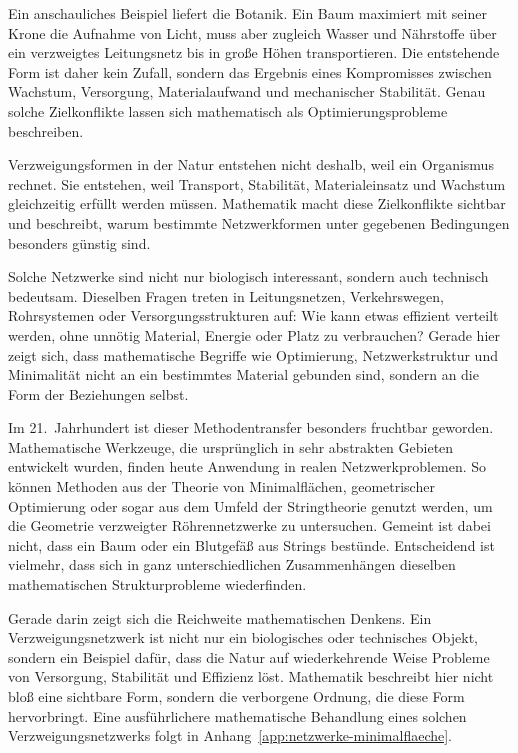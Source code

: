 Ein anschauliches Beispiel liefert die Botanik.
Ein Baum maximiert mit seiner Krone die Aufnahme von Licht,
muss aber zugleich Wasser und Nährstoffe über ein verzweigtes Leitungsnetz
bis in große Höhen transportieren.
Die entstehende Form ist daher kein Zufall,
sondern das Ergebnis eines Kompromisses zwischen Wachstum,
Versorgung,
Materialaufwand
und mechanischer Stabilität.
Genau solche Zielkonflikte lassen sich mathematisch als Optimierungsprobleme beschreiben.

\begin{DidacticBox}
	\label{box:verzweigungsnetzwerk}
	Verzweigungsformen in der Natur entstehen nicht deshalb,
	weil ein Organismus \glqq rechnet\grqq.
	Sie entstehen,
	weil Transport,
	Stabilität,
	Materialeinsatz
	und Wachstum gleichzeitig erfüllt werden müssen.
	Mathematik macht diese Zielkonflikte sichtbar
	und beschreibt,
	warum bestimmte Netzwerkformen unter gegebenen Bedingungen besonders günstig sind.
\end{DidacticBox}

Solche Netzwerke sind nicht nur biologisch interessant,
sondern auch technisch bedeutsam.
Dieselben Fragen treten in Leitungsnetzen,
Verkehrswegen,
Rohrsystemen
oder Versorgungsstrukturen auf:
Wie kann etwas effizient verteilt werden,
ohne unnötig Material,
Energie
oder Platz zu verbrauchen?
Gerade hier zeigt sich,
dass mathematische Begriffe wie Optimierung,
Netzwerkstruktur
und Minimalität nicht an ein bestimmtes Material gebunden sind,
sondern an die Form der Beziehungen selbst.

Im 21.~Jahrhundert ist dieser Methodentransfer besonders fruchtbar geworden.
Mathematische Werkzeuge,
die ursprünglich in sehr abstrakten Gebieten entwickelt wurden,
finden heute Anwendung in realen Netzwerkproblemen.
So können Methoden aus der Theorie von Minimalflächen,
geometrischer Optimierung
oder sogar aus dem Umfeld der Stringtheorie genutzt werden,
um die Geometrie verzweigter Röhrennetzwerke zu untersuchen.
Gemeint ist dabei nicht,
dass ein Baum oder ein Blutgefäß \glqq aus Strings\grqq{} bestünde.
Entscheidend ist vielmehr,
dass sich in ganz unterschiedlichen Zusammenhängen dieselben mathematischen Strukturprobleme wiederfinden.

Gerade darin zeigt sich die Reichweite mathematischen Denkens.
Ein Verzweigungsnetzwerk ist nicht nur ein biologisches oder technisches Objekt,
sondern ein Beispiel dafür,
dass die Natur auf wiederkehrende Weise Probleme von Versorgung,
Stabilität
und Effizienz löst.
Mathematik beschreibt hier nicht bloß eine sichtbare Form,
sondern die verborgene Ordnung,
die diese Form hervorbringt.
Eine ausführlichere mathematische Behandlung eines solchen Verzweigungsnetzwerks
folgt in Anhang~\ref{app:netzwerke-minimalflaeche}.

